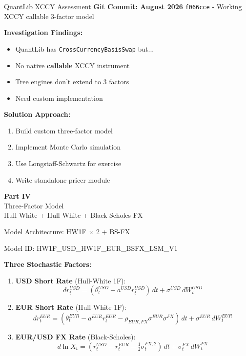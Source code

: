 \documentclass[aspectratio=169,11pt]{beamer}
\begin{document}
\begin{frame}{QuantLib XCCY Assessment}
\textbf{Git Commit: August 2026}
\texttt{f066cce} - Working XCCY callable 3-factor model

\textbf{Investigation Findings:}
\begin{itemize}
    \item QuantLib has \texttt{CrossCurrencyBasisSwap} but...
    \item No native \textbf{callable} XCCY instrument
    \item Tree engines don't extend to 3 factors
    \item Need custom implementation
\end{itemize}

\textbf{Solution Approach:}
\begin{enumerate}
    \item Build custom three-factor model
    \item Implement Monte Carlo simulation
    \item Use Longstaff-Schwartz for exercise
    \item Write standalone pricer module
\end{enumerate}
\end{frame}


\begin{frame}{}
\begin{center}
\Huge\textbf{Part IV}\\[1cm]
\Large Three-Factor Model\\[0.5cm]
\normalsize Hull-White + Hull-White + Black-Scholes FX
\end{center}
\end{frame}

\begin{frame}{Model Architecture: HW1F $\times$ 2 + BS-FX}
\begin{block}{Model ID: HW1F\_USD\_HW1F\_EUR\_BSFX\_LSM\_V1}
\end{block}

\textbf{Three Stochastic Factors:}
\begin{enumerate}
    \item \textbf{USD Short Rate} (Hull-White 1F):
    \[
    dr_t^{USD} = (\theta_t^{USD} - a^{USD} r_t^{USD})\,dt + \sigma^{USD}\,dW_t^{USD}
    \]

    \item \textbf{EUR Short Rate} (Hull-White 1F):
    \[
    dr_t^{EUR} = (\theta_t^{EUR} - a^{EUR} r_t^{EUR} - \rho_{EUR,FX}\sigma^{EUR}\sigma^{FX})\,dt + \sigma^{EUR}\,dW_t^{EUR}
    \]

    \item \textbf{EUR/USD FX Rate} (Black-Scholes):
    \[
    d\ln X_t = (r_t^{USD} - r_t^{EUR} - \tfrac{1}{2}\sigma_t^{FX,2})\,dt + \sigma_t^{FX}\,dW_t^{FX}
    \]
\end{enumerate}
\end{frame}
\end{document}
